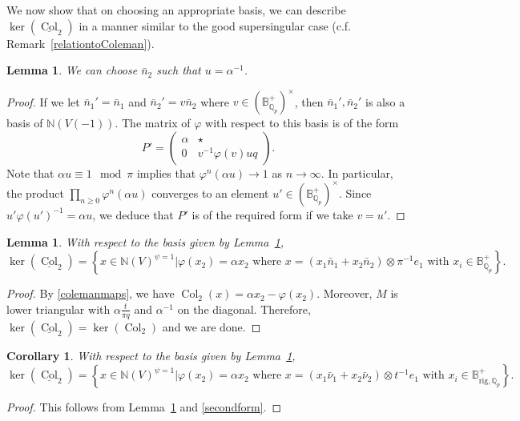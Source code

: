 \documentclass{amsart}
\newcommand{\QQ}{\mathbb Q}
\newcommand{\BB}{\mathbb B}
\newcommand{\NN}{\mathbb N}
\newcommand{\Brig}{\BB^+_{\mathrm{rig},\QQ_p}}
\DeclareMathOperator{\Col}{Col}
\newcommand{\Qp}{\QQ_p}
\newcommand{\vp}{\varphi}
\newtheorem{lemma}[theorem]{Lemma}
\newtheorem{corollary}[theorem]{Corollary}
\begin{document}
    We now show that on choosing an appropriate basis, we can describe $\ker(\underline{\Col}_2)$ in a manner similar to the good supersingular case (c.f. Remark~\ref{relationtoColeman}).

   \begin{lemma}\label{basis}
    We can choose $\bar{n}_2$ such that $u=\alpha^{-1}$.
   \end{lemma}
   \begin{proof}
    If we let $\bar{n}_1'=\bar{n}_1$ and $\bar{n}_2'=v\bar{n}_2$ where $v\in(\BB_{\Qp}^+)^\times$, then $\bar{n}_1',\bar{n}_2'$ is also a basis of $\NN(V(-1))$. The matrix of $\vp$ with respect to this basis is of the form
    \[ P'=\begin{pmatrix} \alpha & \star \\
          0 & v^{-1}\vp(v)uq
         \end{pmatrix}.\]
    Note that $\alpha u\equiv1\mod\pi$ implies that $\vp^n(\alpha u)\rightarrow 1$ as $n\rightarrow\infty$. In particular, the product $\prod_{n\ge0}\vp^n(\alpha u)$ converges to an element $u'\in(\BB_{\Qp}^+)^\times$. Since $u'\vp(u')^{-1}=\alpha u$, we deduce that $P'$ is of the required form if we take $v=u'$.
   \end{proof} 
   
  \begin{lemma}\label{firstform}
   With respect to the basis given by Lemma~\ref{basis},
   \[
   \ker(\underline{\Col}_2)=\left\{x\in\NN(V)^{\psi=1}|\vp(x_2)=\alpha x_2\text{ where }x=(x_1\bar{n}_1+x_2\bar{n}_2)\otimes \pi^{-1}e_1\text{ with } x_i\in\BB_{\Qp}^+\right\}.
   \]
  \end{lemma}
  \begin{proof}
   By \eqref{colemanmaps}, we have $\Col_2(x)=\alpha x_2-\vp(x_2)$. Moreover, $M$ is lower triangular with $\alpha\frac{t}{\pi q}$ and $\alpha^{-1}$ on the diagonal. Therefore, $\ker(\underline{\Col}_2)=\ker(\Col_2)$ and we are done.
  \end{proof}
   
  \begin{corollary}\label{description} 
   With respect to the basis given by Lemma~\ref{basis},
   \[
   \ker(\underline{\Col}_2)=\left\{x\in\NN(V)^{\psi=1}|\vp(x_2)=\alpha x_2\text{ where }x=(x_1\bar{\nu}_1+x_2\bar{\nu}_2)\otimes t^{-1}e_1 \text{ with } x_i\in\Brig\right\}.
   \]
  \end{corollary}
  \begin{proof}
   This follows from Lemma~\ref{firstform} and \eqref{secondform}.
  \end{proof}
\end{document}
